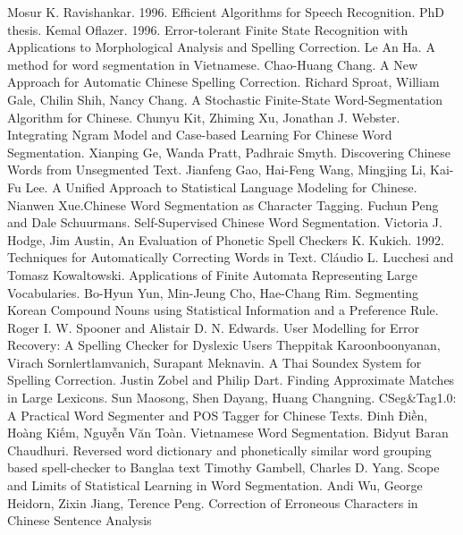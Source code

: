 \documentclass[a4paper,oneside]{book} %
\begin{document}
\begin{thebibliography}{}
Mosur K. Ravishankar. 1996. Efficient Algorithms for
  Speech Recognition. PhD thesis.
Kemal Oflazer. 1996. Error-tolerant Finite State
  Recognition with Applications to Morphological Analysis and Spelling
  Correction.
Le An Ha. A method for word segmentation in
  Vietnamese.
Chao-Huang Chang. A New Approach for
  Automatic Chinese Spelling Correction. 
Richard Sproat, William Gale, Chilin Shih, Nancy
  Chang. A Stochastic Finite-State Word-Segmentation Algorithm for
  Chinese.
Chunyu Kit, Zhiming Xu, Jonathan
  J. Webster. Integrating Ngram Model and Case-based Learning For
  Chinese Word Segmentation.
Xianping Ge, Wanda Pratt,
  Padhraic Smyth. Discovering Chinese Words from Unsegmented Text.
Jianfeng Gao, Hai-Feng Wang, Mingjing Li, Kai-Fu
  Lee. A Unified Approach to Statistical Language Modeling for
  Chinese.
\bibitem{}Nianwen Xue.Chinese Word Segmentation as Character Tagging.
Fuchun Peng and Dale Schuurmans. Self-Supervised Chinese
  Word Segmentation.
Victoria J. Hodge, Jim Austin, An Evaluation of
  Phonetic Spell Checkers
K. Kukich. 1992. Techniques for Automatically Correcting
  Words in Text.
\bibitem{}Cláudio L. Lucchesi and Tomasz Kowaltowski. Applications of
  Finite Automata Representing Large Vocabularies.
\bibitem{}Bo-Hyun Yun, Min-Jeung Cho, Hae-Chang Rim. Segmenting Korean
  Compound Nouns using Statistical Information and a Preference Rule.
\bibitem{}Roger I. W. Spooner and Alistair D. N. Edwards. User
  Modelling for Error Recovery: A Spelling Checker for Dyslexic Users
\bibitem{}Theppitak Karoonboonyanan, Virach Sornlertlamvanich,
  Surapant Meknavin. A Thai Soundex System for Spelling Correction.
\bibitem{}Justin Zobel and Philip Dart. Finding Approximate Matches in
  Large Lexicons.
\bibitem{}Sun Maosong, Shen Dayang, Huang Changning. CSeg\&Tag1.0: A
  Practical Word Segmenter and POS Tagger for Chinese Texts.
Đinh Điền, Hoàng Kiếm, Nguyễn Văn Toàn. Vietnamese Word
  Segmentation.
\bibitem{}Bidyut Baran Chaudhuri. Reversed word dictionary and
  phonetically similar word grouping based spell-checker to Banglaa
  text
\bibitem{}Timothy Gambell, Charles D. Yang. Scope and Limits of
  Statistical Learning in Word Segmentation.
Andi Wu, George Heidorn, Zixin Jiang, Terence
  Peng. Correction of Erroneous Characters in Chinese Sentence
  Analysis

\end{thebibliography}
\end{document}
